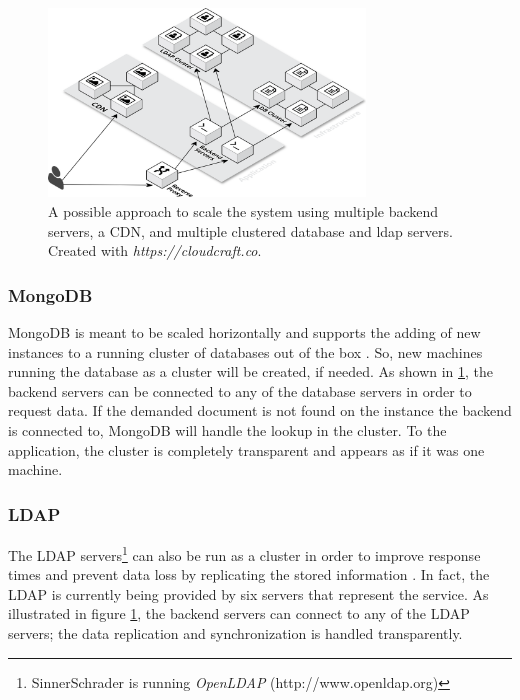 \begin{figure}[!htp]
    \centering
    \includegraphics[width=0.75\textwidth]{images/system_architecture_scaled.png}
    \caption[Illustration: Scaled System Architecture]{A possible approach to scale the system using multiple backend servers, a CDN, and multiple clustered database and ldap servers. Created with \textit{https://cloudcraft.co}.}
    \label{scaleup}
\end{figure}

\newpage

\subsubsection{MongoDB}
MongoDB is meant to be scaled horizontally and supports the adding of new instances to a running cluster of databases out of the box \cite[p. 19]{MongoGuide}. So, new machines running the database as a cluster will be created, if needed. As shown in \ref{scaleup}, the backend servers can be connected to any of the database servers in order to request data. If the demanded document is not found on the instance the backend is connected to, MongoDB will handle the lookup in the cluster. To the application, the cluster is completely transparent and appears as if it was one machine.

\subsubsection{LDAP}
The LDAP servers\footnote{SinnerSchrader is running \textit{OpenLDAP} (http://www.openldap.org)} can also be run as a cluster in order to improve response times and prevent data loss by replicating the stored information \cite{ldapscale}. In fact, the LDAP is currently being provided by six servers that represent the service. As illustrated in figure \ref{scaleup}, the backend servers can connect to any of the LDAP servers; the data replication and synchronization is handled transparently.

